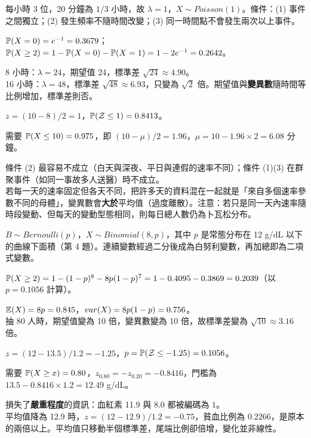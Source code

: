 \begin{answers}
    \item 每小時 3 位，20 分鐘為 $1/3$ 小時，故 $\lambda = 1$，$X \sim Poisson(1)$。條件：(1) 事件之間獨立；(2) 發生頻率不隨時間改變；(3) 同一時間點不會發生兩次以上事件。
    \item $\mathbb{P}(X=0) = e^{-1} = 0.3679$；\quad $\mathbb{P}(X \ge 2) = 1 - \mathbb{P}(X=0) - \mathbb{P}(X=1) = 1 - 2e^{-1} = 0.2642$。
    \item 8 小時：$\lambda = 24$，期望值 $24$，標準差 $\sqrt{24} \approx 4.90$。\\
          16 小時：$\lambda = 48$，標準差 $\sqrt{48} \approx 6.93$，只變為 $\sqrt{2}$ 倍。期望值與\textbf{變異數}隨時間等比例增加，標準差則否。
    \item $z = (10-8)/2 = 1$，$\mathbb{P}(\mathcal{Z} \le 1) = 0.8413$。
    \item 需要 $\mathbb{P}(X \le 10) = 0.975$，即 $(10-\mu)/2 = 1.96$，$\mu = 10 - 1.96 \times 2 = 6.08$ 分鐘。
    \item 條件 (2) 最容易不成立（白天與深夜、平日與連假的速率不同）；條件 (1)(3) 在群聚事件（如同一事故多人送醫）時不成立。\\
          若每一天的速率固定但各天不同，把許多天的資料混在一起就是「來自多個速率參數不同的母體」，變異數會\textbf{大於}平均值（過度離散）。注意：若只是同一天內速率隨時段變動、但每天的變動型態相同，則每日總人數仍為卜瓦松分布。
\end{answers}
\newpage

\begin{answers}
    \item $B \sim Bernoulli(p)$，$X \sim Binomial(8, p)$，其中 $p$ 是常態分布在 12 g/dL 以下的曲線下面積（第 4 題）。連續變數經過二分後成為白努利變數，再加總即為二項式變數。
    \item $\mathbb{P}(X \ge 2) = 1 - (1-p)^8 - 8p(1-p)^7 = 1 - 0.4095 - 0.3869 = 0.2039$（以 $p = 0.1056$ 計算）。
    \item $\mathbb{E}(X) = 8p = 0.845$，$var(X) = 8p(1-p) = 0.756$。\\
          抽 80 人時，期望值變為 10 倍，變異數變為 10 倍，故標準差變為 $\sqrt{10} \approx 3.16$ 倍。
    \item $z = (12-13.5)/1.2 = -1.25$，$p = \mathbb{P}(\mathcal{Z} \le -1.25) = 0.1056$。
    \item 需要 $\mathbb{P}(X \ge x) = 0.80$，$z_{0.80} = -z_{0.20} = -0.8416$，門檻為 $13.5 - 0.8416 \times 1.2 = 12.49$ g/dL。
    \item 損失了\textbf{嚴重程度}的資訊：血紅素 11.9 與 8.0 都被編碼為 $1$。\\
          平均值降為 12.9 時，$z = (12-12.9)/1.2 = -0.75$，貧血比例為 $0.2266$，是原本的兩倍以上。平均值只移動半個標準差，尾端比例卻倍增，變化並非線性。
\end{answers}
\newpage

